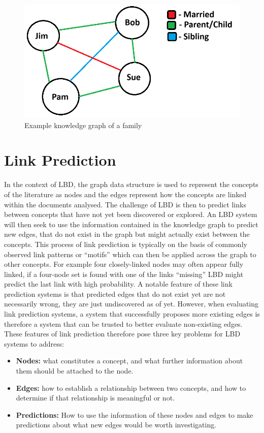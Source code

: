 \documentclass{l4proj}
\begin{document}
\begin{figure}[h]
    \centering
    \includegraphics[width=0.6\linewidth]{images/knowledge_graph.png}
    \caption{Example knowledge graph of a family}
    \label{fig:knowledge_graph}
\end{figure}

\section{Link Prediction}

In the context of LBD, the graph data structure is used to represent the concepts of the literature as nodes and the edges represent how the concepts are linked within the documents analysed. The challenge of LBD is then to predict links between concepts that have not yet been discovered or explored. An LBD system will then seek to use the information contained in the knowledge graph to predict new edges, that do not exist in the graph but might actually exist between the concepts. This process of link prediction is typically on the basis of commonly observed link patterns or ``motifs'' which can then be applied across the graph to other concepts. For example four closely-linked nodes may often appear fully linked, if a four-node set is found with one of the links ``missing'' LBD might predict the last link with high probability. A notable feature of these link prediction systems is that predicted edges that do not exist yet are not necessarily wrong, they are just undiscovered as of yet. However, when evaluating link prediction systems, a system that successfully proposes more existing edges is therefore a system that can be trusted to better evaluate non-existing edges. These features of link prediction therefore pose three key problems for LBD systems to address: \\

\begin{itemize}
    \item \textbf{Nodes:} what constitutes a concept, and what further information about them should be attached to the node.
    \item \textbf{Edges:} how to establish a relationship between two concepts, and how to determine if that relationship is meaningful or not.
    \item \textbf{Predictions:} How to use the information of these nodes and edges to make predictions about what new edges would be worth investigating. \\
\end{itemize}
\end{document}

